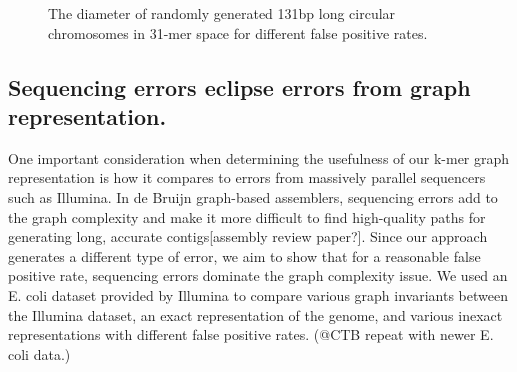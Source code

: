 \documentclass[12pt]{article} \usepackage{simplemargins}
\begin{document}
\begin{figure}
\caption{The diameter of randomly generated 131bp long circular chromosomes in 31-mer 
space for different false positive rates.}
\end{figure}



\subsection{Sequencing errors eclipse errors from graph representation.} One
important consideration when determining the usefulness of our k-mer
graph representation is how it compares to errors from massively
parallel sequencers such as Illumina. In de Bruijn graph-based
assemblers, sequencing errors add to the graph complexity and make it
more difficult to find high-quality paths for generating long,
accurate contigs[assembly review paper?]. Since our approach generates
a different type of error, we aim to show that for a reasonable false
positive rate, sequencing errors dominate the graph complexity
issue. We used an E. coli dataset provided by Illumina to compare
various graph invariants between the Illumina dataset, an exact
representation of the genome, and various inexact representations with
different false positive rates.  (@CTB repeat with newer E. coli data.)
\end{document}
